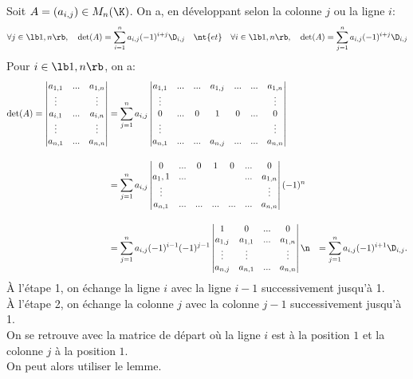\documentclass[11pt]{article}
\begin{document}
\begin{thm}{}{}
    Soit $A=(a_{i,j})\in M_n(\K)$. On a, en développant selon la colonne $j$ ou la ligne $i$:
    \begin{equation*}
        \forall j\in\lb1,n\rb, \quad \det(A)=\sum_{i=1}^na_{i,j}(-1)^{i+j}\D_{i,j} \quad \nt{et} \quad \forall i\in\lb1,n\rb, \quad \det(A)=\sum_{j=1}^na_{i,j}(-1)^{i+j}\D_{i,j}
    \end{equation*}
    \tcblower
    Pour $i\in\lb1,n\rb$, on a:
    \begin{align*}
        \det(A)=\begin{vmatrix}
            a_{1,1} & ... & a_{1,n} \\
            \vdots &  & \vdots \\
            a_{i,1} & ...& a_{i,n}\\
            \vdots &  & \vdots \\
            a_{n,1} & ... & a_{n,n}
        \end{vmatrix}
        &=\sum_{j=1}^na_{i,j}\begin{vmatrix}
            a_{1,1}&...&...&a_{1,j}&...&...&a_{1,n}\\
            \vdots&&&&&&\vdots\\
            0&...&0&1&0&...&0\\
            \vdots&&&&&&\vdots\\
            a_{n,1}&...&...&a_{n,j}&...&...&a_{n,n}
        \end{vmatrix}\\[0.4cm]
        &=\sum_{j=1}^na_{i,j}\begin{vmatrix}
            0&...&0&1&0&...&0\\
            a_1,1&...&&&&...&a_{1,n}\\
            \vdots&&&&&&\vdots\\
            a_{n,1}&...&...&...&...&...&a_{n,n}
        \end{vmatrix}(-1)^n\\[0.4cm]
        &=\sum_{j=1}^na_{i,j}(-1)^{i-1}(-1)^{j-1}\begin{vmatrix}
            1&0&...&0\\
            a_{1,j}&a_{1,1}&...&a_{1,n}\\
            \vdots&\vdots&&\vdots\\
            a_{n,j}&a_{n,1}&...&a_{n,n}
        \end{vmatrix}\n
        &=\sum_{j=1}^na_{i,j}(-1)^{i+1}\D_{i,j}.
    \end{align*}
    À l'étape 1, on échange la ligne $i$ avec la ligne $i-1$ successivement jusqu'à 1.\\
    À l'étape 2, on échange la colonne $j$ avec la colonne $j-1$ successivement jusqu'à 1.\\
    On se retrouve avec la matrice de départ où la ligne $i$ est à la position $1$ et la colonne $j$ à la position $1$.\\
    On peut alors utiliser le lemme.
\end{thm}
\end{document}
